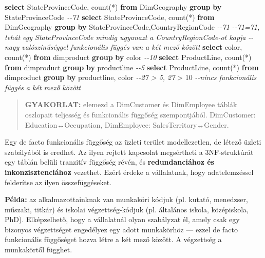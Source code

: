 \documentclass[
  magyar,
]{article}
\newenvironment{Shaded}{}{}
\newcommand{\CommentTok}[1]{\textcolor[rgb]{0.38,0.63,0.69}{\textit{#1}}}
\newcommand{\DecValTok}[1]{\textcolor[rgb]{0.25,0.63,0.44}{#1}}
\newcommand{\FunctionTok}[1]{\textcolor[rgb]{0.02,0.16,0.49}{#1}}
\newcommand{\KeywordTok}[1]{\textcolor[rgb]{0.00,0.44,0.13}{\textbf{#1}}}
\newcommand{\NormalTok}[1]{#1}
\newcommand{\OperatorTok}[1]{\textcolor[rgb]{0.40,0.40,0.40}{#1}}
\begin{document}
\begin{Shaded}
\begin{Highlighting}[]
\KeywordTok{select}\NormalTok{ StateProvinceCode, }\FunctionTok{count}\NormalTok{(}\OperatorTok{*}\NormalTok{) }\KeywordTok{from}\NormalTok{ DimGeography }\KeywordTok{group} \KeywordTok{by}\NormalTok{ StateProvinceCode }\CommentTok{{-}{-}71}
\KeywordTok{select}\NormalTok{ StateProvinceCode, }\FunctionTok{count}\NormalTok{(}\OperatorTok{*}\NormalTok{) }\KeywordTok{from}\NormalTok{ DimGeography }\KeywordTok{group} \KeywordTok{by}
\NormalTok{StateProvinceCode,CountryRegionCode  }\CommentTok{{-}{-}71}
\CommentTok{{-}{-}71=71, tehát egy StateProvinceCode mindig ugyanazt a CountryRegionCode{-}ot kapja}
\CommentTok{{-}{-}nagy valószínűséggel funkcionális függés van a két mező között}
\KeywordTok{select}\NormalTok{ color, }\FunctionTok{count}\NormalTok{(}\OperatorTok{*}\NormalTok{) }\KeywordTok{from}\NormalTok{ dimproduct }\KeywordTok{group} \KeywordTok{by}\NormalTok{ color }\CommentTok{{-}{-}10}
\KeywordTok{select}\NormalTok{ ProductLine, }\FunctionTok{count}\NormalTok{(}\OperatorTok{*}\NormalTok{) }\KeywordTok{from}\NormalTok{ dimproduct }\KeywordTok{group} \KeywordTok{by}\NormalTok{ productline }\CommentTok{{-}{-}5}
\KeywordTok{select}\NormalTok{ ProductLine, }\FunctionTok{count}\NormalTok{(}\OperatorTok{*}\NormalTok{) }\KeywordTok{from}\NormalTok{ dimproduct }\KeywordTok{group} \KeywordTok{by}\NormalTok{ productline, color }\CommentTok{{-}{-}27 \textgreater{} 5, 27}
\OperatorTok{\textgreater{}} \DecValTok{10}
\CommentTok{{-}{-}nincs funkcionális függés a két mező között}
\end{Highlighting}
\end{Shaded}

\begin{quote}
\textbf{GYAKORLAT:} elemezd a DimCustomer és DimEmployee táblák
oszlopait teljesség és funkcionális függőség szempontjából. DimCustomer:
Education↔Occupation, DimEmployee: SalesTerritory↔Gender.
\end{quote}

Egy de facto funkcionális függőség az üzleti terület modellezetlen, de
létező üzleti szabályából is eredhet. Az ilyen rejtett kapcsolat
megsértheti a 3NF-struktúrát egy táblán belüli tranzitív függőség révén,
és \textbf{redundanciához és inkonzisztenciához} vezethet. Ezért érdeke
a vállalatnak, hogy adatelemzéssel felderítse az ilyen összefüggéseket.

\textbf{Példa:} az alkalmazottainknak van munkaköri kódjuk (pl. kutató,
menedzser, műszaki, titkár) és iskolai végzettség-kódjuk (pl. általános
iskola, középiskola, PhD). Elképzelhető, hogy a vállalatnál olyan
szabályzat él, amely csak egy bizonyos végzettséget engedélyez egy adott
munkakörhöz --- ezzel de facto funkcionális függőséget hozva létre a két
mező között. A végzettség a munkakörtől függhet.
\end{document}
